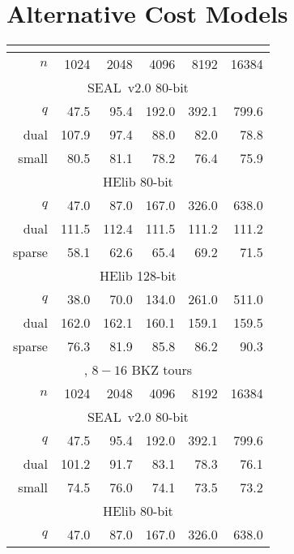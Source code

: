 \documentclass[a4paper]{llncs}
\begin{document}
\section{Alternative Cost Models}\label{sec:alternative-cost-models}
\begin{table}[h]
  \scriptsize
  \begin{center}
    \begin{tabular}{rrrrrr}      
      \multicolumn{6}{c}{\cite{RSA:LinPei11}}\\
      \midrule
      \(n\) & 1024 & 2048 & 4096 & 8192 & 16384\\
      \midrule
      \multicolumn{6}{c}{SEAL~v2.0 80-bit}\\
      $q$   & 47.5  &   95.4 &  192.0 &  392.1 & 799.6\\
      dual  & 107.9 &   97.4 &   88.0 &   82.0 &  78.8\\
      small & 80.5  &   81.1 &   78.2 &   76.4 &  75.9\\
      \midrule
      \multicolumn{6}{c}{HElib 80-bit}\\
      $q$    &  47.0 &   87.0 &  167.0 &  326.0 &  638.0\\
      dual   & 111.5 &  112.4 &  111.5 &  111.2 &  111.2\\
      sparse & 58.1  &   62.6 &   65.4 &   69.2 &   71.5\\
      \midrule
      \multicolumn{6}{c}{HElib 128-bit}\\
      $q$    & 38.0  &   70.0 &  134.0 &  261.0 &  511.0\\
      dual   & 162.0 &  162.1 &  160.1 &  159.1 &  159.5\\
      sparse & 76.3  &   81.9 &   85.8 &   86.2 &   90.3\\
      \midrule
      \multicolumn{6}{c}{\cite{AFRICACRYPT:LepNae14,JMC:AlbPlaSco15}, \(8-16\) BKZ tours}\\
      \midrule
      \(n\) & 1024 & 2048 & 4096 & 8192 & 16384\\
      \midrule
      \multicolumn{6}{c}{SEAL~v2.0 80-bit}\\
      $q$   & 47.5  &   95.4 &  192.0 &  392.1 & 799.6\\
      dual  & 101.2 &   91.7 &   83.1 &   78.3 &   76.1\\
      small & 74.5  &   76.0 &   74.1 &   73.5 &   73.2 \\
      \midrule
      \multicolumn{6}{c}{HElib 80-bit}\\
      $q$    &  47.0 &   87.0 &  167.0 &  326.0 &  638.0\\

\end{tabular}
\end{center}
\end{table}
\end{document}
